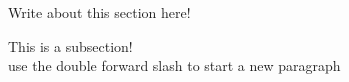 	
	Write about this section here!
	
	
	This is a subsection! \\

	use the double forward slash to start a new paragraph \\
	
	